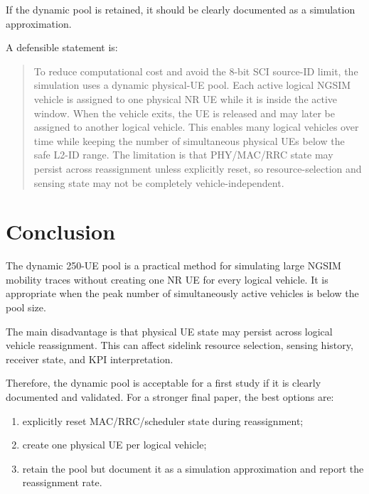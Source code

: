 \documentclass[11pt]{article}
\begin{document}
If the dynamic pool is retained, it should be clearly documented as a simulation approximation.

A defensible statement is:

\begin{quote}
To reduce computational cost and avoid the 8-bit SCI source-ID limit, the simulation uses a dynamic physical-UE pool. Each active logical NGSIM vehicle is assigned to one physical NR UE while it is inside the active window. When the vehicle exits, the UE is released and may later be assigned to another logical vehicle. This enables many logical vehicles over time while keeping the number of simultaneous physical UEs below the safe L2-ID range. The limitation is that PHY/MAC/RRC state may persist across reassignment unless explicitly reset, so resource-selection and sensing state may not be completely vehicle-independent.
\end{quote}

\section{Conclusion}

The dynamic 250-UE pool is a practical method for simulating large NGSIM mobility traces without creating one NR UE for every logical vehicle. It is appropriate when the peak number of simultaneously active vehicles is below the pool size.

The main disadvantage is that physical UE state may persist across logical vehicle reassignment. This can affect sidelink resource selection, sensing history, receiver state, and KPI interpretation.

Therefore, the dynamic pool is acceptable for a first study if it is clearly documented and validated. For a stronger final paper, the best options are:

\begin{enumerate}
    \item explicitly reset MAC/RRC/scheduler state during reassignment;
    \item create one physical UE per logical vehicle;
    \item retain the pool but document it as a simulation approximation and report the reassignment rate.
\end{enumerate}
\end{document}
